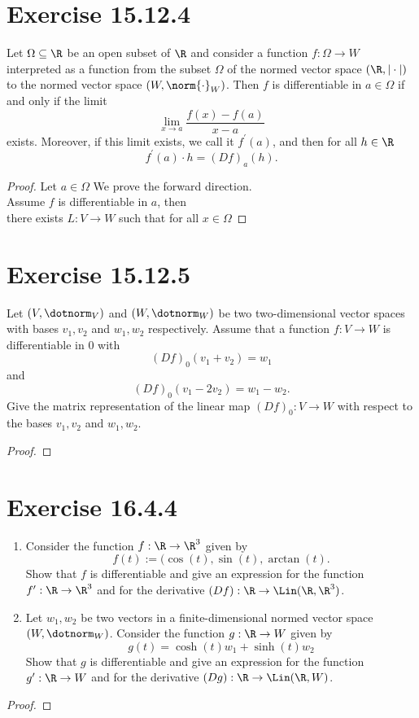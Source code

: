 \documentclass{assignment}
\begin{document}
\section{Exercise 15.12.4}
\begin{problem}
    Let $\Omega \subseteq \R$ be an open subset of $\R$ and consider a function
    $f:\Omega \to W$ interpreted as a function from the subset $\Omega$ of the
    normed vector space $(\R,|\cdot|)$ to the normed vector space
    $(W,\norm{\cdot}_W)$. Then $f$ is differentiable in $a \in \Omega$ if and
    only if the limit 
    $$\lim_{x \to a} \frac{f(x)-f(a)}{x-a}$$ 
    exists. Moreover, if this limit exists, we call it $f^\prime(a)$, and then
    for all $h \in \R$
    $$f^\prime(a)\cdot h = (Df)_a(h).$$
\end{problem}
\begin{proof}
    Let $a \in \Omega$
    We prove the forward direction. \\
    Assume $f$ is differentiable in $a$, then \\
    there exists $L: V \to W$ such that for all $x \in \Omega$
\end{proof}

\section{Exercise 15.12.5}
\begin{problem}
    Let $(V,\dotnorm_V)$ and $(W,\dotnorm_W)$ be two two-dimensional vector spaces with bases $v_1,v_2$ and
    $w_1,w_2$ respectively. Assume that a function $f:V \to W$ is differentiable in 0 with
    $$(Df)_0(v_1+v_2) = w_1$$
    and
    $$(Df)_0(v_1-2v_2)=w_1-w_2.$$
    Give the matrix representation of the linear map $(Df)_0:V \to W$ with respect to the bases $v_1,v_2$ and $w_1,w_2$.
\end{problem}
\begin{proof}
\end{proof}

\section{Exercise 16.4.4}
\begin{problem}
    \begin{enumerate}
        \item Consider the function $f:\R \to \R^3$ given by
            $$f(t) := (\cos(t), \sin(t), \arctan(t).$$
            Show that $f$ is differentiable and give an expression for the function $f^\prime: \R \to \R^3$ and
            for the derivative $(Df): \R \to \Lin(\R,\R^3)$.
        \item Let $w_1,w_2$ be two vectors in a finite-dimensional normed vector space $(W,\dotnorm_W)$.
            Consider the function $g:\R \to W$ given by
            $$g(t) = \cosh(t)w_1 + \sinh(t)w_2$$
            Show that $g$ is differentiable and give an expression for the function $g^\prime: \R \to W$
            and for the derivative $(Dg): \R \to \Lin(\R,W)$.
    \end{enumerate}
\end{problem}
\begin{proof}
\end{proof}
\end{document}
